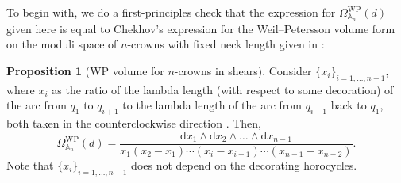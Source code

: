 \documentclass{amsart}
\theoremstyle{definition}
\newtheorem{proposition}{Proposition}[section]
\begin{document}
To begin with, we do a first-principles check that the expression for $\Omega^{\mathrm{WP}}_{\mathbb{A}_n}(d)$ given here is equal to Chekhov's expression for the Weil--Petersson volume form on the moduli space of $n$-crowns with fixed neck length given in \cite[Lemma~{2.2}]{chekhov2024}:

\begin{proposition}[WP volume for $n$-crowns in shears]
\label{prop:vol-form-n-crown}
Consider $\{x_i\}_{i=1,\dotsc,n-1}$, where $x_i$ as the ratio of the lambda length (with respect to some decoration) of the arc from $q_{1}$ to $q_{i+1}$ to the lambda length of the arc from $q_{i+1}$ back to $q_{1}$, both taken in the counterclockwise direction \cite[Equation~{(2.6)}]{chekhov2024}. Then,
\begin{equation}
\label{eq:vol-form-crown-chekhov}
\Omega^{\mathrm{WP}}_{\mathbb{A}_n}(d)
=
\dfrac{ \mathrm{d}x_1\wedge\mathrm{d}x_2\wedge\ldots\wedge\mathrm{d}x_{n-1}}
{x_1(x_2-x_1)\cdots (x_i-x_{i-1})\cdots (x_{n-1}-x_{n-2}) }.
\end{equation}
Note that $\{x_i\}_{i=1,\dotsc,n-1}$ does not depend on the decorating horocycles.
\end{proposition}
\end{document}
